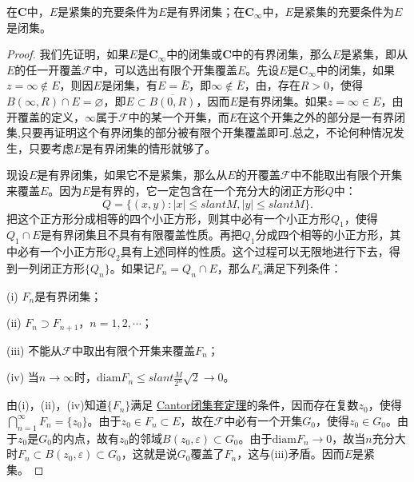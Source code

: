 \documentclass[../../main.tex]{subfiles}
\begin{document}
\begin{theorem}\label{theorem:Heine-Borel定理}
在\(\mathbf{C}\)中，\(E\)是紧集的充要条件为\(E\)是有界闭集；在\(\mathbf{C}_\infty\)中，\(E\)是紧集的充要条件为\(E\)是闭集。
\end{theorem}
\begin{proof}
我们先证明，如果\(E\)是\(\mathbf{C}_\infty\)中的闭集或\(\mathbf{C}\)中的有界闭集，那么\(E\)是紧集，即从\(E\)的任一开覆盖\(\mathscr{F}\)中，可以选出有限个开集覆盖\(E\)。先设\(E\)是\(\mathbf{C}_\infty\)中的闭集，如果\(z = \infty \notin E\)，则因\(E\)是闭集，有\(E = \bar{E}\)，即\(\infty \notin \bar{E}\)，由，存在\(R > 0\)，使得\(B(\infty, R) \cap E = \varnothing\)，即\(E \subset \overline{B(0, R)}\)，因而\(E\)是有界闭集。如果\(z = \infty \in E\)，由开覆盖的定义，\(\infty\)属于\(\mathscr{F}\)中的某一个开集，而\(E\)在这个开集之外的部分是一有界闭集,只要再证明这个有界闭集的部分被有限个开集覆盖即可.总之，不论何种情况发生，只要考虑\(E\)是有界闭集的情形就够了。

现设\(E\)是有界闭集，如果它不是紧集，那么从\(E\)的开覆盖\(\mathscr{F}\)中不能取出有限个开集来覆盖\(E\)。因为\(E\)是有界的，它一定包含在一个充分大的闭正方形\(Q\)中：
\[
Q = \{ (x, y) : | x | \leqslant slant M, | y | \leqslant slant M \}.
\]
把这个正方形分成相等的四个小正方形，则其中必有一个小正方形\(Q_1\)，使得\(Q_1 \cap E\)是有界闭集且不具有有限覆盖性质。再把\(Q_1\)分成四个相等的小正方形，其中必有一个小正方形\(Q_2\)具有上述同样的性质。这个过程可以无限地进行下去，得到一列闭正方形\(\{ Q_n \}\)。如果记\(F_n = Q_n \cap E\)，那么\(F_n\)满足下列条件：

(i) \(F_n\)是有界闭集；

(ii) \(F_n \supset F_{n + 1}\)，\(n = 1, 2, \cdots\)；

(iii) 不能从\(\mathscr{F}\)中取出有限个开集来覆盖\(F_n\)；

(iv) 当\(n \to \infty\)时，\(\mathrm{diam}F_n \leqslant slant \frac{M}{2^n} \sqrt{2} \to 0\)。

由(i)，(ii)，(iv)知道\(\{ F_n \}\)满足 \hyperref[theorem:Cantor闭集套定理]{Cantor闭集套定理}的条件，因而存在复数\(z_0\)，使得\(\bigcap_{n = 1}^\infty F_n = \{ z_0 \}\)。由于\(z_0 \in F_n \subset E\)，故在\(\mathscr{F}\)中必有一个开集\(G_0\)，使得\(z_0 \in G_0\)。由于\(z_0\)是\(G_0\)的内点，故有\(z_0\)的邻域\(B(z_0, \varepsilon) \subset G_0\)。由于\(\mathrm{diam}F_n \to 0\)，故当\(n\)充分大时\(F_n \subset B(z_0, \varepsilon) \subset G_0\)，这就是说\(G_0\)覆盖了\(F_n\)，这与(iii)矛盾。因而\(E\)是紧集。


\end{proof}
\end{document}
